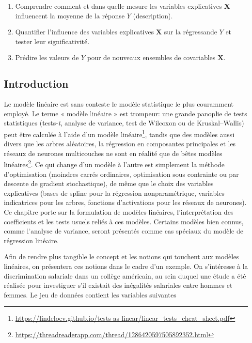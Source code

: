 \documentclass[
  11pt,
  letterpaper,
]{article}
\providecommand{\tightlist}{%
  \setlength{\itemsep}{0pt}\setlength{\parskip}{0pt}}
\renewcommand{\href}[2]{#2\footnote{\url{#1}}}
\theoremstyle{definition}
\theoremstyle{definition}
\theoremstyle{definition}
\theoremstyle{definition}
\theoremstyle{remark}
\begin{document}
\begin{enumerate}
\def\labelenumi{\arabic{enumi}.}
\tightlist
\item
  Comprendre comment et dans quelle mesure les variables explicatives \(\mathbf{X}\) influencent la moyenne de la réponse \(Y\) (description).
\item
  Quantifier l'influence des variables explicatives \(\mathbf{X}\) sur la régressande \(Y\) et tester leur significativité.
\item
  Prédire les valeurs de \(Y\) pour de nouveaux ensembles de covariables \(\mathbf{X}\).
\end{enumerate}

\hypertarget{introduction}{%
\subsection{Introduction}\label{introduction}}

Le modèle linéaire est sans conteste le modèle statistique le plus couramment employé. Le terme « modèle linéaire » est trompeur: une grande panoplie de tests statistiques (tests-\emph{t}, analyse de variance, test de Wilcoxon ou de Kruskal--Wallis) \href{https://lindeloev.github.io/tests-as-linear/linear_tests_cheat_sheet.pdf}{peut être calculée à l'aide d'un modèle linéaire}, tandis que \href{https://threadreaderapp.com/thread/1286420597505892352.html}{des modèles aussi divers que les arbres aléatoires, la régression en composantes principales et les réseaux de neurones multicouches ne sont en réalité que de bêtes modèles linéaires}. Ce qui change d'un modèle à l'autre est simplement la méthode d'optimisation (moindres carrés ordinaires, optimisation sous contrainte ou par descente de gradient stochastique), de même que le choix des variables explicatives (bases de spline pour la régression nonparamétrique, variables indicatrices pour les arbres, fonctions d'activations pour les réseaux de neurones). Ce chapitre porte sur la formulation de modèles linéaires, l'interprétation des coefficients et les tests usuels reliés à ces modèles. Certains modèles bien connus, comme l'analyse de variance, seront présentés comme cas spéciaux du modèle de régression linéaire.

Afin de rendre plus tangible le concept et les notions qui touchent aux modèles linéaires, on présentera ces notions dans le cadre d'un exemple. On s'intéresse à la discrimination salariale dans un collège américain, au sein duquel une étude a été réalisée pour investiguer s'il existait des inégalités salariales entre hommes et femmes. Le jeu de données contient les variables suivantes
\end{document}
